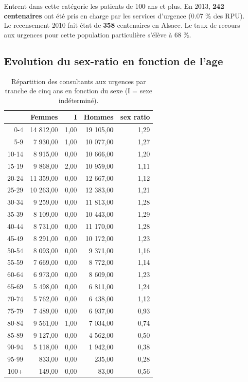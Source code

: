 \documentclass[12pt,english,french,twoside]{book}\usepackage[]{graphicx}\usepackage[]{color}
\begin{document}
Entrent dans cette catégorie les patients de 100 ans et plus. En 2013, \textbf{242 centenaires} ont été pris en charge par les services d'urgence (0.07  \% des RPU).  
Le recensement 2010 fait état de \textbf{358} centenaires en Alsace. Le taux de recours aux urgences pour cette population particulière s'élève à  68 \%.


\subsection*{Evolution du sex-ratio en fonction de l'age}



\begin{table}[ht]
\centering
\begin{tabular}{rrrrr}
  \hline
 & Femmes & I & Hommes & sex ratio \\ 
  \hline
0-4 & 14 812,00 & 1,00 & 19 105,00 & 1,29 \\ 
  5-9 & 7 930,00 & 1,00 & 10 077,00 & 1,27 \\ 
  10-14 & 8 915,00 & 0,00 & 10 666,00 & 1,20 \\ 
  15-19 & 9 868,00 & 2,00 & 10 959,00 & 1,11 \\ 
  20-24 & 11 359,00 & 0,00 & 12 667,00 & 1,12 \\ 
  25-29 & 10 263,00 & 0,00 & 12 383,00 & 1,21 \\ 
  30-34 & 9 259,00 & 0,00 & 11 813,00 & 1,28 \\ 
  35-39 & 8 109,00 & 0,00 & 10 443,00 & 1,29 \\ 
  40-44 & 8 731,00 & 0,00 & 11 170,00 & 1,28 \\ 
  45-49 & 8 291,00 & 0,00 & 10 172,00 & 1,23 \\ 
  50-54 & 8 093,00 & 0,00 & 9 371,00 & 1,16 \\ 
  55-59 & 7 669,00 & 0,00 & 8 772,00 & 1,14 \\ 
  60-64 & 6 973,00 & 0,00 & 8 609,00 & 1,23 \\ 
  65-69 & 5 498,00 & 0,00 & 6 811,00 & 1,24 \\ 
  70-74 & 5 762,00 & 0,00 & 6 438,00 & 1,12 \\ 
  75-79 & 7 489,00 & 0,00 & 6 937,00 & 0,93 \\ 
  80-84 & 9 561,00 & 1,00 & 7 034,00 & 0,74 \\ 
  85-89 & 9 127,00 & 0,00 & 4 562,00 & 0,50 \\ 
  90-94 & 5 118,00 & 0,00 & 1 942,00 & 0,38 \\ 
  95-99 & 833,00 & 0,00 & 235,00 & 0,28 \\ 
  100+ & 149,00 & 0,00 & 83,00 & 0,56 \\ 
   \hline
\end{tabular}
\caption[]{Répartition des consultants aux urgences par tranche de cinq ans en fonction du sexe (I = sexe indéterminé).} 
\label{tab:sr2}
\end{table}
\end{document}
